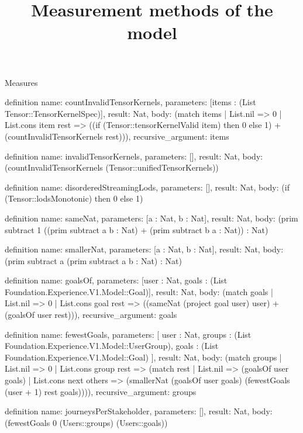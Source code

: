 \begin{lexlean}{Measures}
\title{Measurement methods of the model}
\begin{semanticmodule}
definition{
  name: countInvalidTensorKernels,
  parameters: [items : (List Tensor::TensorKernelSpec)],
  result: Nat,
  body: (match items
    | List.nil => 0
    | List.cons item rest => ((if (Tensor::tensorKernelValid item) then 0 else 1) + (countInvalidTensorKernels rest))),
  recursive_argument: items
}

definition{
  name: invalidTensorKernels,
  parameters: [],
  result: Nat,
  body: (countInvalidTensorKernels (Tensor::unifiedTensorKernels))
}

definition{
  name: disorderedStreamingLods,
  parameters: [],
  result: Nat,
  body: (if (Tensor::lodsMonotonic) then 0 else 1)
}

definition{
  name: sameNat,
  parameters: [a : Nat, b : Nat],
  result: Nat,
  body: (prim subtract 1 ((prim subtract a b : Nat) + (prim subtract b a : Nat)) : Nat)
}

definition{
  name: smallerNat,
  parameters: [a : Nat, b : Nat],
  result: Nat,
  body: (prim subtract a (prim subtract a b : Nat) : Nat)
}

definition{
  name: goalsOf,
  parameters: [user : Nat, goals : (List Foundation.Experience.V1.Model::Goal)],
  result: Nat,
  body: (match goals
    | List.nil => 0
    | List.cons goal rest => ((sameNat (project goal user) user) + (goalsOf user rest))),
  recursive_argument: goals
}

definition{
  name: fewestGoals,
  parameters: [
    user : Nat,
    groups : (List Foundation.Experience.V1.Model::UserGroup),
    goals : (List Foundation.Experience.V1.Model::Goal)
  ],
  result: Nat,
  body: (match groups
    | List.nil => 0
    | List.cons group rest => (match rest
      | List.nil => (goalsOf user goals)
      | List.cons next others => (smallerNat (goalsOf user goals) (fewestGoals (user + 1) rest goals)))),
  recursive_argument: groups
}

definition{
  name: journeysPerStakeholder,
  parameters: [],
  result: Nat,
  body: (fewestGoals 0 (Users::groups) (Users::goals))
}


\end{semanticmodule}
\end{lexlean}
